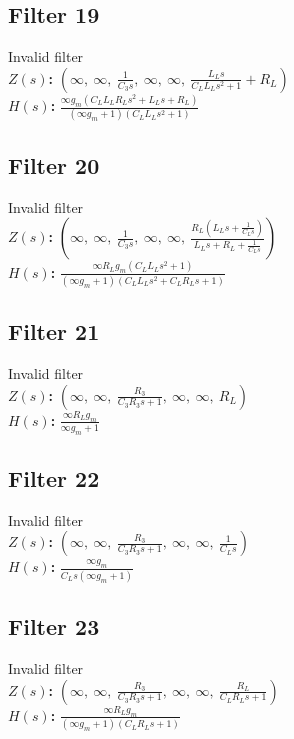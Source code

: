 \documentclass{article}
\begin{document}
\subsection*{Filter 19}
Invalid filter \\ 
\textbf{$Z(s)$:} $\left( \infty, \  \infty, \  \frac{1}{C_{3} s}, \  \infty, \  \infty, \  \frac{L_{L} s}{C_{L} L_{L} s^{2} + 1} + R_{L}\right)$ \\ 
\textbf{$H(s)$:} $\frac{\infty g_{m} \left(C_{L} L_{L} R_{L} s^{2} + L_{L} s + R_{L}\right)}{\left(\infty g_{m} + 1\right) \left(C_{L} L_{L} s^{2} + 1\right)}$ \\ 
\subsection*{Filter 20}
Invalid filter \\ 
\textbf{$Z(s)$:} $\left( \infty, \  \infty, \  \frac{1}{C_{3} s}, \  \infty, \  \infty, \  \frac{R_{L} \left(L_{L} s + \frac{1}{C_{L} s}\right)}{L_{L} s + R_{L} + \frac{1}{C_{L} s}}\right)$ \\ 
\textbf{$H(s)$:} $\frac{\infty R_{L} g_{m} \left(C_{L} L_{L} s^{2} + 1\right)}{\left(\infty g_{m} + 1\right) \left(C_{L} L_{L} s^{2} + C_{L} R_{L} s + 1\right)}$ \\ 
\subsection*{Filter 21}
Invalid filter \\ 
\textbf{$Z(s)$:} $\left( \infty, \  \infty, \  \frac{R_{3}}{C_{3} R_{3} s + 1}, \  \infty, \  \infty, \  R_{L}\right)$ \\ 
\textbf{$H(s)$:} $\frac{\infty R_{L} g_{m}}{\infty g_{m} + 1}$ \\ 
\subsection*{Filter 22}
Invalid filter \\ 
\textbf{$Z(s)$:} $\left( \infty, \  \infty, \  \frac{R_{3}}{C_{3} R_{3} s + 1}, \  \infty, \  \infty, \  \frac{1}{C_{L} s}\right)$ \\ 
\textbf{$H(s)$:} $\frac{\infty g_{m}}{C_{L} s \left(\infty g_{m} + 1\right)}$ \\ 
\subsection*{Filter 23}
Invalid filter \\ 
\textbf{$Z(s)$:} $\left( \infty, \  \infty, \  \frac{R_{3}}{C_{3} R_{3} s + 1}, \  \infty, \  \infty, \  \frac{R_{L}}{C_{L} R_{L} s + 1}\right)$ \\ 
\textbf{$H(s)$:} $\frac{\infty R_{L} g_{m}}{\left(\infty g_{m} + 1\right) \left(C_{L} R_{L} s + 1\right)}$ \\ 
\end{document}
